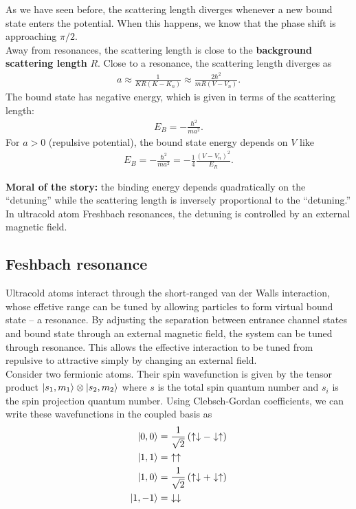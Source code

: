 \documentclass{book}
\theoremstyle{definition}
\newcommand{\f}[2]{\frac{#1}{#2}}
\newcommand{\lp}{\left(}
\newcommand{\rp}{\right)}
\begin{document}
As we have seen before, the scattering length diverges whenever a new bound state enters the potential. When this happens, we know that the phase shift is approaching $\pi/2$. \\


Away from resonances, the scattering length is close to the \textbf{background scattering length} $R$. Close to a resonance, the scattering length diverges as 
\begin{align*}
	a\approx \f{1}{KR(K-K_n)} \approx \f{2\hbar^2}{mR(V-V_n)}.
\end{align*}
The bound state has negative energy, which is given in terms of the scattering length:
\begin{align*}
	E_B = -\f{\hbar^2}{ma^2}.
\end{align*}
For $a>0$ (repulsive potential), the bound state energy depends on $V$ like
\begin{align*}
	E_B = -\f{\hbar^2}{ma^2} = -\f{1}{4}\f{(V-V_n)^2}{E_R}.
\end{align*}

\begin{framed}
	\noindent \textbf{Moral of the story:} the binding energy depends quadratically on the ``detuning'' while the scattering length is inversely proportional to the ``detuning.'' In ultracold atom Freshbach resonances, the detuning is controlled by an external magnetic field. 
\end{framed}





\subsection{Feshbach resonance}

Ultracold atoms interact through the short-ranged van der Walls interaction, whose effetive range can be tuned by allowing particles to form virtual bound state -- a resonance. By adjusting the separation between entrance channel states and bound state through an external magnetic field, the system can be tuned through resonance. This allows the effective interaction to be tuned from repulsive to attractive simply by changing an external field. \\


Consider two fermionic atoms. Their spin wavefunction is given by the tensor product $\ket{s_1,m_1}\otimes \ket{s_2,m_2}$ where $s$ is the total spin quantum number and $s_i$ is the spin projection quantum number. Using Clebsch-Gordan  coefficients, we can write these wavefunctions in the coupled basis as
\begin{align*}
\ket{0,0} &= \f{1}{\sqrt{2}}\lp  \uparrow\downarrow - \downarrow\uparrow \rp \\
\ket{1,1} &= \,\,\uparrow\uparrow \\
\ket{1,0} &= \f{1}{\sqrt{2}}\lp \uparrow \downarrow + \downarrow\uparrow \rp \\
\ket{1,-1} &= \,\,\downarrow\downarrow
\end{align*}
\end{document}

